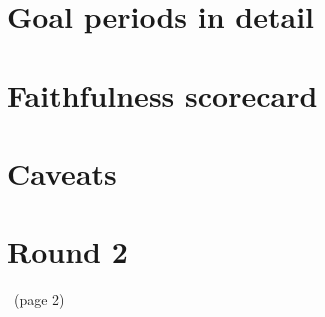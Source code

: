 {  \section*{Goal periods in detail}
  {\scriptsize \hPeriodTable\par}
  \section*{Faithfulness scorecard}
  {\footnotesize \hScoreTable\par}
  \section*{Caveats}
  \hCaveats
  \section*{Round 2}
  \ifx\hNext\empty\else \hNext\par\fi
  {\footnotesize \hRoundTwo\par}
  \par\vfill
  {\tiny\color{inkmuted}\hFooter\ (page 2)\par}
}
